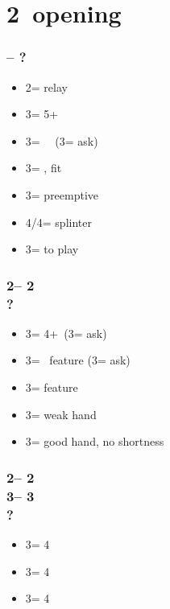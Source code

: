 \documentclass[12pt, a4paper]{report}
\begin{document}
\section*{\colorbox{blue!30}{2\spades\ opening}}
 {

    \subsubsection*{\alrts{2\spades} -- ?}
    \begin{itemize}
        \item 2\nt = relay
        \item 3\clubs = 5+\hearts\ \fonce
        \item 3\diams = \minor\ \gf\ (3\hearts = ask)
        \item 3\hearts = \invp, \hearts fit
        \item 3\spades = preemptive
        \item 4\minor/4\hearts = splinter
        \item 3\nt = to play
    \end{itemize}

    \subsubsection*{2\spades -- 2\nt\\
                    ?}
    \begin{itemize}
        \item 3\clubs = 4+\minor\ (3\diams = ask)
        \item 3\diams = \minor\ feature (3\hearts = ask)
        \item 3\hearts = \hearts feature
        \item 3\spades = weak hand
        \item 3\nt = good hand, no shortness
    \end{itemize}

    \subsubsection*{2\spades -- 2\nt\\
                    3\clubs -- 3\diams\\
                    ?}
    \begin{itemize}
        \item 3\hearts = 4\hearts
        \item 3\spades = 4\clubs
        \item 3\nt = 4\diams
    \end{itemize}

}
\end{document}
